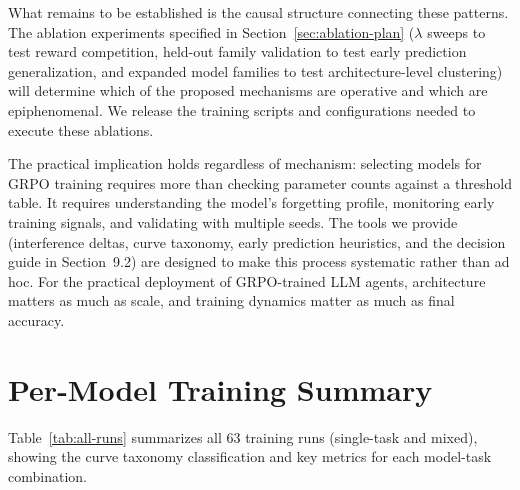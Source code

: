 \documentclass[11pt]{article}
\begin{document}
What remains to be established is the causal structure connecting these patterns.  The ablation experiments specified in Section~\ref{sec:ablation-plan} ($\lambda$ sweeps to test reward competition, held-out family validation to test early prediction generalization, and expanded model families to test architecture-level clustering) will determine which of the proposed mechanisms are operative and which are epiphenomenal.  We release the training scripts and configurations needed to execute these ablations.

The practical implication holds regardless of mechanism: selecting models for GRPO training requires more than checking parameter counts against a threshold table.  It requires understanding the model's forgetting profile, monitoring early training signals, and validating with multiple seeds.  The tools we provide (interference deltas, curve taxonomy, early prediction heuristics, and the decision guide in Section~9.2) are designed to make this process systematic rather than ad hoc.  For the practical deployment of GRPO-trained LLM agents, architecture matters as much as scale, and training dynamics matter as much as final accuracy.




\appendix

\section{Per-Model Training Summary}
\label{app:training-summary}

Table~\ref{tab:all-runs} summarizes all 63 training runs (single-task and mixed), showing the curve taxonomy classification and key metrics for each model-task combination.
\end{document}
